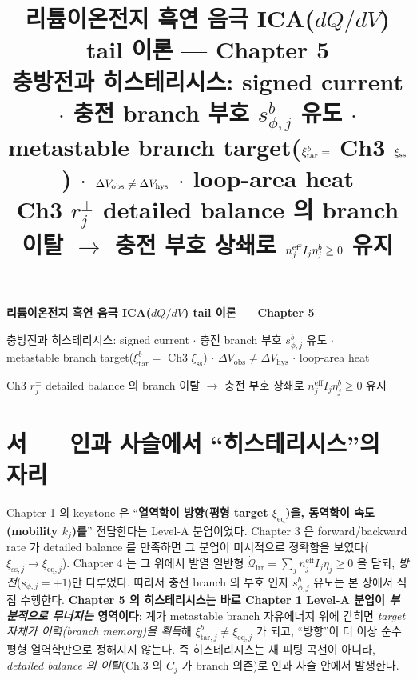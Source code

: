 \documentclass[11pt,a4paper]{article}
\title{\textbf{리튬이온전지 흑연 음극 ICA($dQ/dV$) tail 이론 — Chapter 5}\\[0.4em]
\large 충방전과 히스테리시스: signed current $\cdot$ 충전 branch 부호 $s_{\phi,j}^b$ 유도 $\cdot$\\
metastable branch target($\xi_\tar^b=$ Ch3 $\xi_\sstat$) $\cdot$ $\Delta V_\obs\ne\Delta V_\hys$ $\cdot$ loop-area heat\\[0.2em]
\normalsize Ch3 $r_j^\pm$ detailed balance 의 branch 이탈 $\to$ 충전 부호 상쇄로 $n_j^{\eff}I_j\eta_j^b\ge0$ 유지}
\newcommand{\eff}{\mathrm{eff}}
\newcommand{\eq}{\mathrm{eq}}
\newcommand{\irr}{\mathrm{irr}}
\newcommand{\hys}{\mathrm{hys}}
\newcommand{\obs}{\mathrm{obs}}
\newcommand{\tar}{\mathrm{tar}}
\newcommand{\sstat}{\mathrm{ss}}
\begin{document}
\sloppy
\begin{center}
{\LARGE\bfseries 리튬이온전지 흑연 음극 ICA($dQ/dV$) tail 이론 — Chapter 5\par}
\vspace{0.4em}
{\large 충방전과 히스테리시스: signed current $\cdot$ 충전 branch 부호 $s_{\phi,j}^b$ 유도 $\cdot$\\
metastable branch target($\xi_\tar^b=$ Ch3 $\xi_\sstat$) $\cdot$ $\Delta V_\obs\ne\Delta V_\hys$ $\cdot$ loop-area heat\par}
\vspace{0.2em}
{\normalsize Ch3 $r_j^\pm$ detailed balance 의 branch 이탈 $\to$ 충전 부호 상쇄로 $n_j^{\eff}I_j\eta_j^b\ge0$ 유지\par}
\end{center}

\section*{서 — 인과 사슬에서 ``히스테리시스''의 자리}
Chapter 1 의 keystone 은 ``\textbf{열역학이 방향(평형 target $\xi_{\eq}$)을, 동역학이 속도(mobility $k_j$)를}''
전담한다는 Level-A 분업이었다. Chapter 3 은 forward/backward rate 가 detailed balance 를 만족하면 그 분업이
미시적으로 정확함을 보였다($\xi_{\sstat,j}\to\xi_{\eq,j}$). Chapter 4 는 그 위에서 발열 일반형
$\dot{\mathcal Q}_\irr=\sum_j n_j^{\eff}I_j\eta_j\ge0$ 을 닫되, \emph{방전}($s_{\phi,j}=+1$)만 다루었다.
따라서 충전 branch 의 부호 인자 $s_{\phi,j}^b$ 유도는 본 장에서 직접 수행한다.
\textbf{Chapter 5 의 히스테리시스는 바로 Chapter 1 Level-A 분업이 \emph{부분적으로 무너지는} 영역이다}: 계가 metastable
branch 자유에너지 위에 갇히면 \emph{target 자체가 이력(branch memory)을 획득}해 $\xi_{\tar,j}^b\ne\xi_{\eq,j}$
가 되고, ``방향''이 더 이상 순수 평형 열역학만으로 정해지지 않는다. 즉 히스테리시스는 새 피팅 곡선이 아니라,
\emph{detailed balance 의 이탈}(Ch.3 의 $C_j$ 가 branch 의존)로 인과 사슬 안에서 발생한다.
\end{document}
